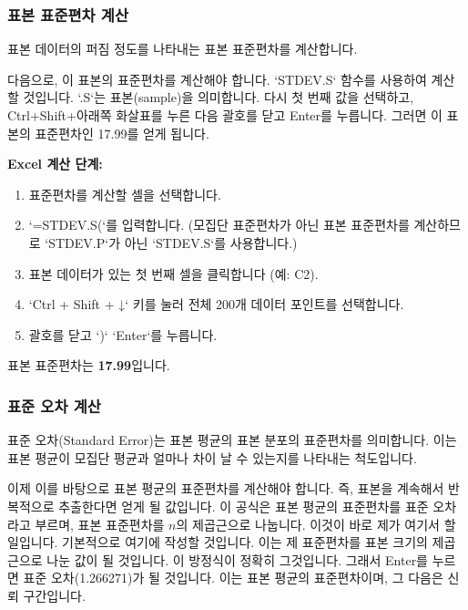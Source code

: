 \documentclass[11pt,a4paper]{article}
\begin{document}
\subsubsection{표본 표준편차 계산}

표본 데이터의 퍼짐 정도를 나타내는 표본 표준편차를 계산합니다.

\begin{tcolorbox}[title=슬라이드 37: 뉴욕 일일 기온 샘플 Excel 시트 (6/22)]
다음으로, 이 표본의 표준편차를 계산해야 합니다. `STDEV.S` 함수를 사용하여 계산할 것입니다. `.S`는 표본(sample)을 의미합니다. 다시 첫 번째 값을 선택하고, Ctrl+Shift+아래쪽 화살표를 누른 다음 괄호를 닫고 Enter를 누릅니다. 그러면 이 표본의 표준편차인 17.99를 얻게 됩니다.
\end{tcolorbox}

\textbf{Excel 계산 단계:}
\begin{enumerate}
    \item 표준편차를 계산할 셀을 선택합니다.
    \item `=STDEV.S(`를 입력합니다. (모집단 표준편차가 아닌 표본 표준편차를 계산하므로 `STDEV.P`가 아닌 `STDEV.S`를 사용합니다.)
    \item 표본 데이터가 있는 첫 번째 셀을 클릭합니다 (예: C2).
    \item `Ctrl + Shift + ↓` 키를 눌러 전체 200개 데이터 포인트를 선택합니다.
    \item 괄호를 닫고 `)` `Enter`를 누릅니다.
\end{enumerate}
\begin{tcolorbox}[colback=mygreen!10!white, colframe=mygreen!75!black, title=계산 결과: 표본 표준편차]
표본 표준편차는 \textbf{17.99}입니다.
\end{tcolorbox}

\subsubsection{표준 오차 계산}

표준 오차(Standard Error)는 표본 평균의 표본 분포의 표준편차를 의미합니다. 이는 표본 평균이 모집단 평균과 얼마나 차이 날 수 있는지를 나타내는 척도입니다.

\begin{tcolorbox}[title=슬라이드 38: 뉴욕 일일 기온 샘플 Excel 시트 (7/22)]
이제 이를 바탕으로 표본 평균의 표준편차를 계산해야 합니다. 즉, 표본을 계속해서 반복적으로 추출한다면 얻게 될 값입니다. 이 공식은 표본 평균의 표준편차를 표준 오차라고 부르며, 표본 표준편차를 $n$의 제곱근으로 나눕니다.
이것이 바로 제가 여기서 할 일입니다. 기본적으로 여기에 작성할 것입니다. 이는 제 표준편차를 표본 크기의 제곱근으로 나눈 값이 될 것입니다. 이 방정식이 정확히 그것입니다. 그래서 Enter를 누르면 표준 오차(1.266271)가 될 것입니다. 이는 표본 평균의 표준편차이며, 그 다음은 신뢰 구간입니다.
\end{tcolorbox}
\end{document}
